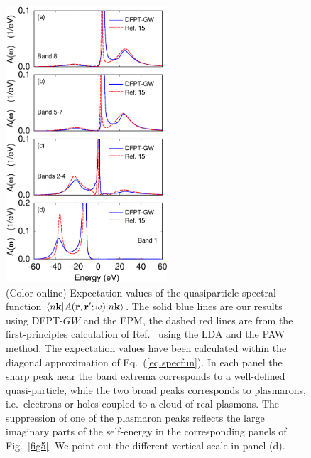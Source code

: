 \documentclass[twocolumn,prb,showpacs,superscriptaddress]{revtex4}
\def\w{\omega}
\def\k{{\bf k}}
\def\r{{\bf r}}
\def\rp{{\bf r^\prime}}
\begin{document}
\begin  {figure}
\begin  {center}
\includegraphics[width=6cm]{fig6.eps}
\end    {center}
\caption{\label{fig6}
        (Color online)
        Expectation values of the quasiparticle spectral function $\langle n\k| A(\r,\rp;\w)|n\k\rangle$.
        The solid blue lines are our results using DFPT-$GW$ and the EPM, the dashed red lines are from the first-principles 
        calculation of Ref.\  using the LDA and the PAW method.
        The expectation values have been calculated within the diagonal approximation of Eq.\ (\ref{eq.specfun}).
        In each panel the sharp peak near the band extrema corresponds to a well-defined quasi-particle, while the two broad peaks
        corresponds to plasmarons, i.e.\ electrons or holes coupled to a cloud of real plasmons.\cite{hl}
        The suppression of one of the plasmaron peaks reflects the large imaginary parts of the self-energy in the
        corresponding panels of Fig.\ \ref{fig5}. We point out the different vertical scale in panel (d).
        }
\end    {figure}
\end{document}
